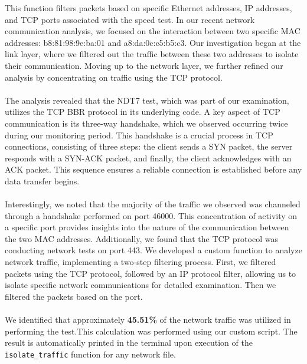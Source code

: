 \documentclass{article}
\begin{document}
This function filters packets based on specific Ethernet addresses, IP addresses, and TCP ports associated with the speed test. In our recent network communication analysis, we focused on the interaction between two specific MAC addresses: b8:81:98:9e:ba:01 and a8:da:0c:c5:b5:c3. Our investigation began at the link layer, where we filtered out the traffic between these two addresses to isolate their communication. Moving up to the network layer, we further refined our analysis by concentrating on traffic using the TCP protocol.
\\\\
The analysis revealed that the NDT7 test, which was part of our examination, utilizes the TCP BBR protocol in its underlying code. A key aspect of TCP communication is its three-way handshake, which we observed occurring twice during our monitoring period. This handshake is a crucial process in TCP connections, consisting of three steps: the client sends a SYN packet, the server responds with a SYN-ACK packet, and finally, the client acknowledges with an ACK packet. This sequence ensures a reliable connection is established before any data transfer begins.
\\\\
Interestingly, we noted that the majority of the traffic we observed was channeled through a handshake performed on port 46000. This concentration of activity on a specific port provides insights into the nature of the communication between the two MAC addresses. Additionally, we found that the TCP protocol was conducting network tests on port 443. We developed a custom function to analyze network traffic, implementing a two-step filtering process. First, we filtered packets using the TCP protocol, followed by an IP protocol filter, allowing us to isolate specific network communications for detailed examination. Then we filtered the packets based on the port.
\\\\
We identified that approximately \textbf{45.51\%} of the network traffic was utilized in performing the test.This calculation was performed using our custom script. The result is automatically printed in the terminal upon execution of the \texttt{isolate\_traffic} function for any network file.
\end{document}
